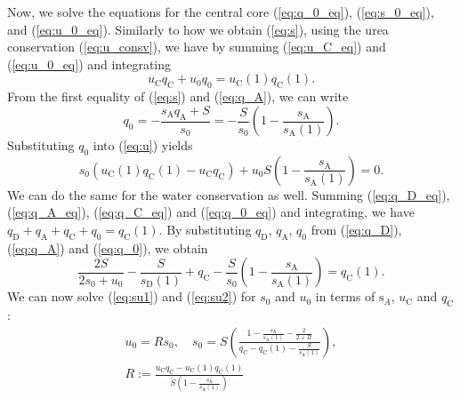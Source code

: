 \documentclass{article}
\numberwithin{equation}{section} %
\begin{document}
Now, we solve the equations for the central core (\ref{eq:q_0_eq}), (\ref{eq:s_0_eq}), and (\ref{eq:u_0_eq}).
Similarly to how we obtain (\ref{eq:s}), using the urea conservation (\ref{eq:u_consv}), we have by summing (\ref{eq:u_C_eq}) and (\ref{eq:u_0_eq}) and integrating
\begin{equation}\label{eq:u}
    u_\mathrm{C}q_\mathrm{C}+u_0q_0 = u_\mathrm{C}(1)q_\mathrm{C}(1).
\end{equation}
From the first equality of (\ref{eq:s}) and (\ref{eq:q_A}), we can write
\begin{equation}\label{eq:q_0}
    q_0 =-\frac{s_\mathrm{A}q_\mathrm{A}+S}{s_0} = -\frac{S}{s_0}\left( 1-\frac{s_\mathrm{A}}{s_\mathrm{A}(1)}  \right).
\end{equation}
Substituting $q_0$ into (\ref{eq:u}) yields
\begin{equation}\label{eq:su1}
    s_0\left( u_\mathrm{C}(1)q_\mathrm{C}(1) - u_\mathrm{C}q_\mathrm{C} \right) + u_0S\left( 1-  \frac{s_\mathrm{A}}{s_\mathrm{A}(1)} \right) = 0.
\end{equation}
We can do the same for the water conservation as well.
Summing (\ref{eq:q_D_eq}), (\ref{eq:q_A_eq}), (\ref{eq:q_C_eq}) and (\ref{eq:q_0_eq}) and integrating, we have $q_\mathrm{D}+q_\mathrm{A}+q_\mathrm{C}+q_0 = q_\mathrm{C}(1)$.
By substituting $q_\mathrm{D}$, $q_\mathrm{A}$, $q_0$ from (\ref{eq:q_D}), (\ref{eq:q_A}) and (\ref{eq:q_0}), we obtain
\begin{equation}\label{eq:su2}
    \frac{2S}{2s_0+u_0}-\frac{S}{s_\mathrm{D}(1)}+q_\mathrm{C}-\frac{S}{s_0}\left( 1-\frac{s_\mathrm{A}}{s_\mathrm{A}(1)} \right) = q_\mathrm{C}(1).
\end{equation}
We can now solve (\ref{eq:su1}) and (\ref{eq:su2}) for $s_0$ and $u_0$ in terms of $\mathrm{s}_A$, $u_\mathrm{C}$ and $q_\mathrm{C}$:
\begin{gather}
    u_0 = Rs_0,\quad s_0 = S\left( \frac{1-\frac{s_\mathrm{A}}{s_\mathrm{A}(1)} - \frac{2}{2+R}}{q_\mathrm{C} - q_\mathrm{C}(1) - \frac{S}{s_\mathrm{A}(1)}} \right),\label{eq:su}\\
    R:=\frac{u_\mathrm{C}q_\mathrm{C} - u_\mathrm{C}(1)q_\mathrm{C}(1)}{S\left( 1-\frac{s_\mathrm{A}}{s_\mathrm{A}(1)} \right)}
\end{gather}
\end{document}
